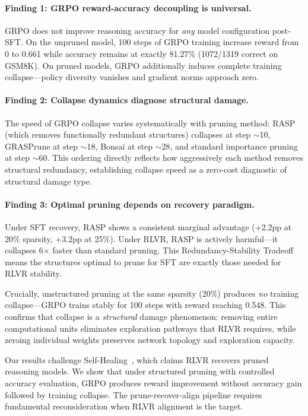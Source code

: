 \documentclass[11pt,a4paper]{article}
\begin{document}
\paragraph{Finding 1: GRPO reward-accuracy decoupling is universal.} GRPO does not improve reasoning accuracy for \emph{any} model configuration post-SFT. On the unpruned model, 100 steps of GRPO training increase reward from 0 to 0.661 while accuracy remains at exactly 81.27\% (1072/1319 correct on GSM8K). On pruned models, GRPO additionally induces complete training collapse---policy diversity vanishes and gradient norms approach zero.

\paragraph{Finding 2: Collapse dynamics diagnose structural damage.} The speed of GRPO collapse varies systematically with pruning method: RASP (which removes functionally redundant structures) collapses at step $\sim$10, GRASPrune at step $\sim$18, Bonsai at step $\sim$28, and standard importance pruning at step $\sim$60. This ordering directly reflects how aggressively each method removes structural redundancy, establishing collapse speed as a zero-cost diagnostic of structural damage type.

\paragraph{Finding 3: Optimal pruning depends on recovery paradigm.} Under SFT recovery, RASP shows a consistent marginal advantage (+2.2pp at 20\% sparsity, +3.2pp at 25\%). Under RLVR, RASP is actively harmful---it collapses 6$\times$ faster than standard pruning. This Redundancy-Stability Tradeoff means the structures optimal to prune for SFT are exactly those needed for RLVR stability.

Crucially, unstructured pruning at the same sparsity (20\%) produces \emph{no} training collapse---GRPO trains stably for 100 steps with reward reaching 0.548. This confirms that collapse is a \emph{structural} damage phenomenon: removing entire computational units eliminates exploration pathways that RLVR requires, while zeroing individual weights preserves network topology and exploration capacity.

Our results challenge Self-Healing~\cite{self-healing-2025}, which claims RLVR recovers pruned reasoning models. We show that under structured pruning with controlled accuracy evaluation, GRPO produces reward improvement without accuracy gain followed by training collapse. The prune-recover-align pipeline requires fundamental reconsideration when RLVR alignment is the target.
\end{document}

